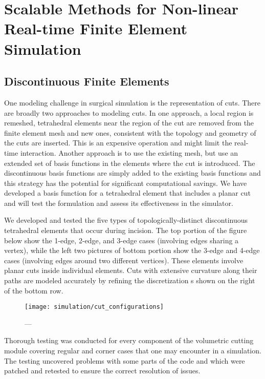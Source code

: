 

\clearpage

\section{Scalable Methods for Non-linear Real-time Finite Element Simulation}\label{sec:fem_simulation}

\subsection{Discontinuous Finite Elements}\label{ssec:discontinuous_fem}
One modeling challenge in surgical simulation is the representation of cuts. There are broadly two approaches to modeling cuts. In one approach, a local region is remeshed, \ie tetrahedral elements near the region of the cut are removed from the finite element mesh and new ones, consistent with the topology and geometry of the cuts are inserted. This is an expensive operation and might limit the real-time interaction. Another approach is to use the existing mesh, but use an extended set of basis functions in the elements where the cut is introduced. The discontinuous basis functions are simply added to the existing basis functions and this strategy has the potential for significant computational savings. We have developed a basis function for a tetrahedral element that includes a planar cut and will test the formulation and assess its effectiveness in the simulator.

We developed and tested the five types of topologically-distinct discontinuous tetrahedral elements that occur during incision. The top portion of the figure below show the 1-edge, 2-edge, and 3-edge cases (involving edges sharing a vertex), while the left two pictures of bottom portion show the 3-edge and 4-edge cases (involving edges around two different vertices). These elements involve planar cuts inside individual elements. Cuts with extensive curvature along their paths are modeled accurately by refining the discretization s shown on the right of the bottom row.

\begin{figure}
  \centering%
  \texttt{[image: simulation/cut\_configurations]}
  \caption{---}\label{fig:discontinuous_tetrahedra_fem}
\end{figure}

Thorough testing was conducted for every component of the volumetric cutting module covering regular and corner cases that one may encounter in a simulation. The testing uncovered problems with some parts of the code and which were patched and retested to ensure the correct resolution of issues.

